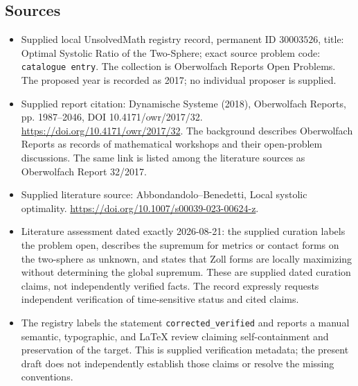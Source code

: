 \documentclass[11pt]{article}
\begin{document}
\subsection{Sources}
\begin{itemize}
\item Supplied local UnsolvedMath registry record, permanent ID \(30003526\), title: Optimal Systolic Ratio of the Two-Sphere; exact source problem code: \texttt{catalogue entry}. The collection is Oberwolfach Reports Open Problems. The proposed year is recorded as 2017; no individual proposer is supplied.
\item Supplied report citation: Dynamische Systeme (2018), Oberwolfach Reports, pp. 1987--2046, DOI 10.4171/owr/2017/32. \url{https://doi.org/10.4171/owr/2017/32}. The background describes Oberwolfach Reports as records of mathematical workshops and their open-problem discussions. The same link is listed among the literature sources as Oberwolfach Report 32/2017.
\item Supplied literature source: Abbondandolo--Benedetti, Local systolic optimality. \url{https://doi.org/10.1007/s00039-023-00624-z}.
\item Literature assessment dated exactly 2026-08-21: the supplied curation labels the problem open, describes the supremum for metrics or contact forms on the two-sphere as unknown, and states that Zoll forms are locally maximizing without determining the global supremum. These are supplied dated curation claims, not independently verified facts. The record expressly requests independent verification of time-sensitive status and cited claims.
\item The registry labels the statement \texttt{corrected\_verified} and reports a manual semantic, typographic, and LaTeX review claiming self-containment and preservation of the target. This is supplied verification metadata; the present draft does not independently establish those claims or resolve the missing conventions.
\end{itemize}
\end{document}
